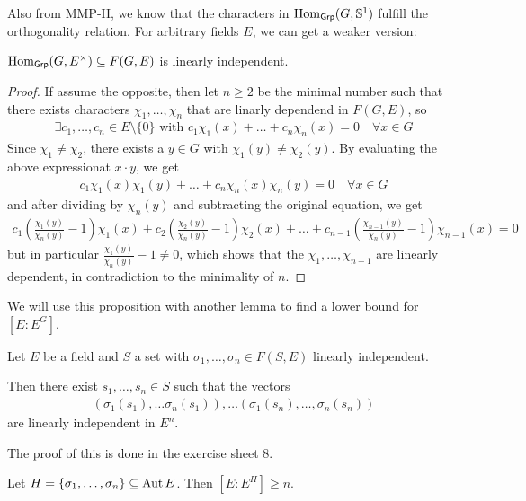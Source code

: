 Also from MMP-II, we know that the characters in $\operatorname{Hom}_{\text{\sffamily Grp}}(G,\mathbb{S}^{1})$ fulfill the orthogonality relation.
For arbitrary fields $E$, we can get a weaker version:

\begin{prop}[Dedekind]\label{prop:dedekind}
  $\operatorname{Hom}_{\text{\sffamily Grp}}(G,E^{\times}) \subseteq F(G,E)$ is linearly independent.
\end{prop}
\begin{proof}
  If assume the opposite, then let $n \geq 2$ be the minimal number such that there exists characters $\chi_1, \ldots, \chi_n$ that are linarly dependend in $F(G,E)$, so
  \begin{align*}
    \exists c_1, \ldots, c_n \in E \setminus \{0\} \text{ with } c_1 \chi_1(x) + \ldots + c_n \chi_n(x) = 0 \quad \forall x \in G
  \end{align*}
  Since $\chi_1 \neq \chi_2$, there exists a $y \in G$ with $\chi_1(y) \neq \chi_2(y)$.
  By evaluating the above expressionat $x \cdot y$, we get
  \begin{align*}
    c_1 \chi_1(x) \chi_1(y) + \ldots + c_n \chi_n(x) \chi_n(y) = 0 \quad \forall  x \in G
  \end{align*}
  and after dividing by $\chi_n(y)$ and subtracting the original equation, we get
  \begin{align*}
    c_1 \left(
      \frac{\chi_1(y)}{\chi_n(y)} - 1
    \right)
    \chi_1(x)
    +
    c_2 \left(
      \frac{\chi_2(y)}{\chi_n(y)} - 1
    \right)
    \chi_2(x)
    + \ldots
    +
    c_{n-1} \left(
      \frac{\chi_{n-1}(y)}{\chi_n(y)} - 1
    \right)
    \chi_{n-1}(x)
    =
    0
  \end{align*}
  but in particular $\frac{\chi_1(y)}{\chi_n(y)} - 1 \neq 0$, which shows that the $\chi_{1}, \ldots, \chi_{n-1}$ are linearly dependent, in contradiction to the minimality of $n$.
\end{proof}

We will use this proposition with another lemma to find a lower bound for $[E:E^{G}]$. 


\begin{lemma}[]\label{lem:4-6}
  Let $E$ be a field and $S$ a set with $\sigma_{1}, \ldots, \sigma_{n} \in F(S,E)$ linearly independent.

  Then there exist $s_{1}, \ldots, s_{n} \in S$ such that the vectors
  \begin{align*}
    (\sigma_1(s_1), \ldots \sigma_n(s_1)), \ldots (\sigma_1(s_n), \ldots, \sigma_n(s_n))
  \end{align*}
  are linearly independent in $E^{n}$.
\end{lemma}
The proof of this is done in the exercise sheet 8.


\begin{lem}[]\label{lem:4-7}
  Let $H = \{\sigma_1, \ldots, \sigma_n\} \subseteq \operatorname{Aut} E$. Then $[E:E^{H}] \geq n$.
\end{lem}
